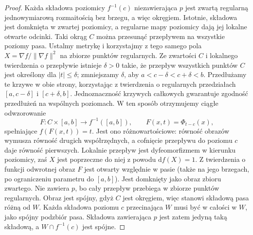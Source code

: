 \begin{proof}
Każda składowa poziomicy $f^{-1}(c)$ niezawierająca
$p$ jest zwartą regularną jednowymiarową rozmaitością
bez brzegu, a więc okręgiem. Istotnie, składowa jest
domknięta w zwartej poziomicy, a regularne mapy
poziomicy dają jej lokalne otwarte odcinki.
Taki okrąg $C$ można przesunąć przepływem na wszystkie
poziomy pasa. Ustalmy metrykę i korzystajmy z tego
samego pola $X=\nabla f/\|\nabla f\|^2$ na zbiorze
punktów regularnych. Ze zwartości $C$ i lokalnego
twierdzenia o przepływie istnieje $\delta>0$ takie,
że przepływ wszystkich punktów $C$ jest określony
dla $|t|\le\delta$; zmniejszamy $\delta$, aby
$a<c-\delta<c+\delta<b$. Przedłużamy te krzywe
w obie strony, korzystając z twierdzenia o regularnych
przedziałach $[a,c-\delta]$ i $[c+\delta,b]$.
Jednoznaczność krzywych całkowych gwarantuje
zgodność przedłużeń na wspólnych poziomach.
W ten sposób otrzymujemy ciągłe odwzorowanie
\[
 F:C\times[a,b]\longrightarrow f^{-1}([a,b]),
 \qquad F(x,t)=\Phi_{t-c}(x),
\]
spełniające $f(F(x,t))=t$. Jest ono różnowartościowe:
równość obrazów wymusza równość drugich współrzędnych,
a cofnięcie przepływu do poziomu $c$ daje równość
pierwszych. Lokalnie przepływ jest dyfeomorfizmem
w kierunku poziomicy, zaś $X$ jest poprzeczne do niej
z powodu $\mathrm df(X)=1$. Z twierdzenia o funkcji
odwrotnej obraz $F$ jest otwarty względnie w pasie
(także na jego brzegach, po ograniczeniu parametru
do $[a,b]$). Jest domknięty jako obraz zbioru zwartego.
Nie zawiera $p$, bo cały przepływ przebiega w zbiorze
punktów regularnych. Obraz jest spójny, gdyż $C$ jest
okręgiem, więc stanowi składową pasa różną od $W$.
Każda składowa poziomu $c$ przecinająca $W$ musi być
w całości w $W$, jako spójny podzbiór pasa. Składowa
zawierająca $p$ jest zatem jedyną taką składową,
a $W\cap f^{-1}(c)$ jest spójne.


\end{proof}
